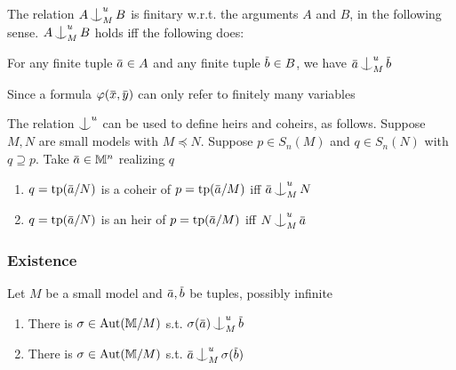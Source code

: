 \documentclass[11pt]{article}
\begin{document}
\begin{remark}
The relation \(A\ind_M^uB\) is finitary w.r.t. the arguments \(A\) and \(B\), in the following
sense. \(A\ind_M^uB\) holds iff the following does:

For any finite tuple \(\bara\in A\) and any finite tuple \(\barb\in B\), we
have \(\bara\ind_M^u\barb\)

Since a formula \(\varphi(\barx,\bary)\) can only refer to finitely many variables
\end{remark}

\begin{remark}
The relation \(\ind^u\) can be used to define heirs and coheirs, as follows. Suppose \(M,N\) are
small models with \(M\preceq N\). Suppose \(p\in S_n(M)\) and \(q\in S_n(N)\) with \(q\supseteq p\).
Take \(\bara\in\M^n\) realizing \(q\)
\begin{enumerate}
\item \(q=\tp(\bara/N)\) is a coheir of \(p=\tp(\bara/M)\) iff \(\bara\ind_M^uN\)
\item \(q=\tp(\bara/N)\) is an heir of \(p=\tp(\bara/M)\) iff \(N\ind_M^u\bara\)
\end{enumerate}
\end{remark}
\subsubsection{Existence}
\label{sec:orga51158f}
\begin{lemma}[]
Let \(M\) be a small model and \(\bara,\barb\) be tuples, possibly infinite
\begin{enumerate}
\item There is \(\sigma\in\operatorname{\text{Aut}}(\mathbb{M}/M)\) s.t. \(\sigma(\bara)\ind_M^u\barb\)
\item There is \(\sigma\in\operatorname{\text{Aut}}(\mathbb{M}/M)\) s.t. \(\bara\ind_M^u\sigma(\barb)\)
\end{enumerate}
\end{lemma}
\end{document}
